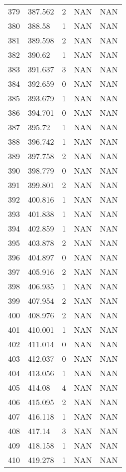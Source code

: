 \documentclass{article}
\begin{document}
\begin{longtable}{@{}lllll@{}}
				379 & 387.562 & 2    & NAN  & NAN  \\
				380 & 388.58  & 1    & NAN  & NAN  \\
				381 & 389.598 & 2    & NAN  & NAN  \\
				382 & 390.62  & 1    & NAN  & NAN  \\
				383 & 391.637 & 3    & NAN  & NAN  \\
				384 & 392.659 & 0    & NAN  & NAN  \\
				385 & 393.679 & 1    & NAN  & NAN  \\
				386 & 394.701 & 0    & NAN  & NAN  \\
				387 & 395.72  & 1    & NAN  & NAN  \\
				388 & 396.742 & 1    & NAN  & NAN  \\
				389 & 397.758 & 2    & NAN  & NAN  \\
				390 & 398.779 & 0    & NAN  & NAN  \\
				391 & 399.801 & 2    & NAN  & NAN  \\
				392 & 400.816 & 1    & NAN  & NAN  \\
				393 & 401.838 & 1    & NAN  & NAN  \\
				394 & 402.859 & 1    & NAN  & NAN  \\
				395 & 403.878 & 2    & NAN  & NAN  \\
				396 & 404.897 & 0    & NAN  & NAN  \\
				397 & 405.916 & 2    & NAN  & NAN  \\
				398 & 406.935 & 1    & NAN  & NAN  \\
				399 & 407.954 & 2    & NAN  & NAN  \\
				400 & 408.976 & 2    & NAN  & NAN  \\
				401 & 410.001 & 1    & NAN  & NAN  \\
				402 & 411.014 & 0    & NAN  & NAN  \\
				403 & 412.037 & 0    & NAN  & NAN  \\
				404 & 413.056 & 1    & NAN  & NAN  \\
				405 & 414.08  & 4    & NAN  & NAN  \\
				406 & 415.095 & 2    & NAN  & NAN  \\
				407 & 416.118 & 1    & NAN  & NAN  \\
				408 & 417.14  & 3    & NAN  & NAN  \\
				409 & 418.158 & 1    & NAN  & NAN  \\
				410 & 419.278 & 1    & NAN  & NAN  \\

\end{longtable}
\end{document}
